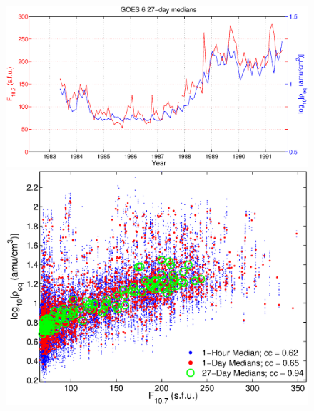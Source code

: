 \begin{figure}[htp!]
\centering
\includegraphics[scale=0.40]{2016SW001507R-p02a.eps}
\includegraphics[scale=0.40]{2016SW001507R-p02b.eps}
\end{figure}
